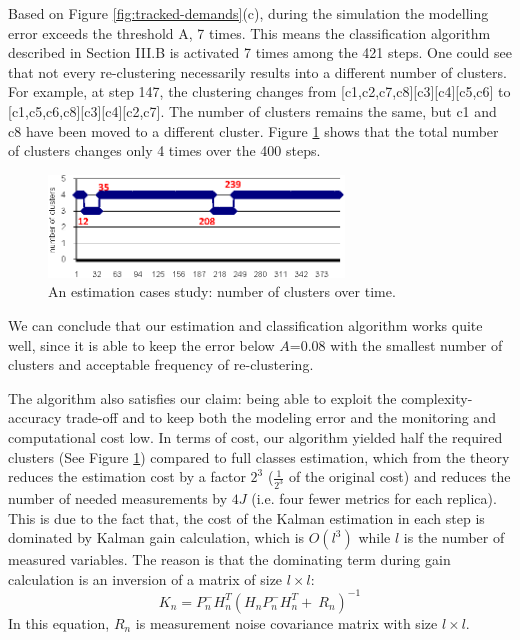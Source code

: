Based on Figure \ref{fig:tracked-demands}(c), during the simulation the modelling error exceeds the threshold A, 7 times. This means the classification algorithm described in Section III.B is activated 7 times among the 421 steps. One could see that not every re-clustering necessarily results into a different number of clusters. For example, at step 147, the clustering changes from [c1,c2,c7,c8][c3][c4][c5,c6] to [c1,c5,c6,c8][c3][c4][c2,c7]. The number of clusters remains the same, but c1 and c8 have been moved to a different cluster. Figure \ref{fig:number-clusters-over-time} shows that the total number of clusters changes only 4 times over the 400 steps.
\begin{figure}[h]
	\centering
	\includegraphics[width=0.7\textwidth]{image/number-clusters-versus-simulation-steps.eps}
	\caption[An estimation cases study: number of clusters over time.]{An estimation cases study: number of clusters over time.}
	\label{fig:number-clusters-over-time}
\end{figure}

We can conclude that our estimation and classification algorithm works quite well, since it is able to keep the error below $A$=0.08 with the smallest number of clusters and acceptable frequency of re-clustering. 

The algorithm also satisfies our claim: being able to exploit the complexity-accuracy trade-off and to keep both the modeling error and the monitoring and computational cost low. In terms of cost, our algorithm yielded half the required clusters (See Figure \ref{fig:number-clusters-over-time}) compared to full classes estimation, which from the theory reduces the estimation cost by a factor $2^3$ ($\frac{1}{2^3}$ of the original cost) and reduces the number of needed
measurements by $4J$ (i.e. four fewer metrics for each replica). This is due to the fact that, the cost of the Kalman estimation in each step is dominated by Kalman gain calculation, which is $O(l^3)$ while $l$ is the number of measured variables. The reason is that the dominating term during gain calculation is an inversion of a matrix of size $l\times l$:
\begin{equation}
	K_n=P^-_nH^T_n{(H_nP^-_nH^T_n+\ R_n)}^{-1}
\end{equation} 
In this equation, $R_n$ is measurement noise covariance matrix with size $l\times l$.

